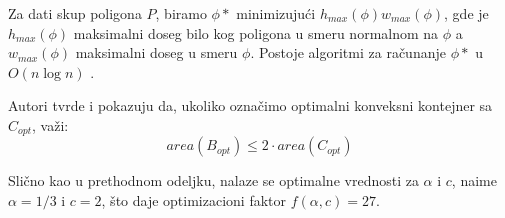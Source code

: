 \documentclass[a4paper]{article}
\theoremstyle{plain}
\theoremstyle{definition}
\begin{document}
Za dati skup poligona $P$, biramo $\phi*$  minimizuju\'c{}i $h_{max}(\phi)w_{max}(\phi)$, gde je $h_{max}(\phi)$ maksimalni doseg bilo kog poligona u smeru normalnom na $\phi$ a $w_{max}(\phi)$ maksimalni doseg u smeru $\phi$. Postoje algoritmi za ra\v{c}unanje $\phi*$ u $O(n\log{}n)$ \cite{BuildingThreeConvexPolygons}.

Autori tvrde i pokazuju da, ukoliko ozna\v{c}imo optimalni konveksni kontejner sa $C_{opt}$, va\v{z}i: $$area(B_{opt}) \leq 2 \cdot area(C_{opt})$$

Sli\v{c}no kao u prethodnom odeljku, nalaze se optimalne vrednosti za $\alpha$ i $c$, naime $\alpha = 1/3$ i $c = 2$, \v{s}to daje optimizacioni faktor $f(\alpha, c) = 27$.


\appendix



\end{document}

